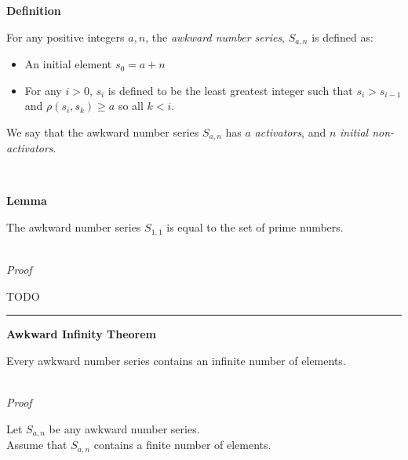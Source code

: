 \documentclass[a4paper,12pt]{article}
\begin{document}
\label{definition:awkward_number_series}
\hypertarget{definition:awkward_number_series}{}
\begin{tcolorbox}
\textbf{Definition}

\noindent For any positive integers $a, n$, the \textit{awkward number series}, $S_{a, n}$ is defined as:

\begin{itemize}
\item An initial element $s_0 = a + n$
\item For any $i > 0$, $s_i$ is defined to be the least greatest integer such that $s_i > s_{i - 1}$ and $\rho(s_i, s_k) \geq a$ so all $k < i$.
\end{itemize}


\noindent We say that the awkward number series $S_{a,n}$ has $a$ \textit{activators}, and $n$ \textit{initial non-activators}.

\end{tcolorbox}
\noindent \\





\label{lemma:prime_asn}
\hypertarget{lemma:prime_asn}{}
\begin{tcolorbox}
\textbf{Lemma}

The awkward number series $S_{1, 1}$ is equal to the set of prime numbers.
\end{tcolorbox}

\noindent \\
\textit{Proof}

\noindent TODO

\begin{center}
\noindent\rule{8cm}{0.4pt}
\end{center}







\label{theorem:infinite_asn}
\hypertarget{theorem:infinite_asn}{}
\begin{tcolorbox}
\textbf{Awkward Infinity Theorem}

Every awkward number series contains an infinite number of elements.
\end{tcolorbox}

\noindent \\
\textit{Proof}

\noindent Let $S_{a,n}$ be any awkward number series.\\

\noindent Assume that $S_{a,n}$ contains a finite number of elements.\\
\end{document}
